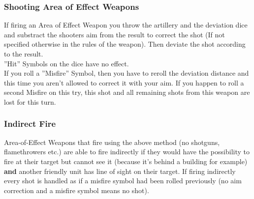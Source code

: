 \documentclass[
	11pt,
	toc=bibliography
	]{article}
\begin{document}
\subsubsection{Shooting Area of Effect Weapons}\label{shootingAoEWeapons}
If firing an Area of Effect Weapon you throw the artillery and the deviation dice and substract the shooters aim from the result to correct the shot (If not specified otherwise in the rules of the weapon). Then deviate the shot according to the result.\\
''Hit'' Symbols on the dice have no effect. \\
If you roll a ''Misfire'' Symbol, then you have to reroll the deviation distance and this time you aren't allowed to correct it with your aim. If you happen to roll a second Misfire on this try, this shot and all remaining shots from this weapon are lost for this turn. 

\subsubsection{Indirect Fire}\label{indirectFire}
Area-of-Effect Weapons that fire using the above method (no shotguns, flamethrowers etc.) are able to fire indirectly if they would have the possibility to fire at their target but cannot see it (because it’s behind a building for example) \textbf{and} another friendly unit has line of sight on their target. If firing indirectly every shot is handled as if a misfire symbol had been rolled previously (no aim correction and a misfire symbol means no shot).
\end{document}

